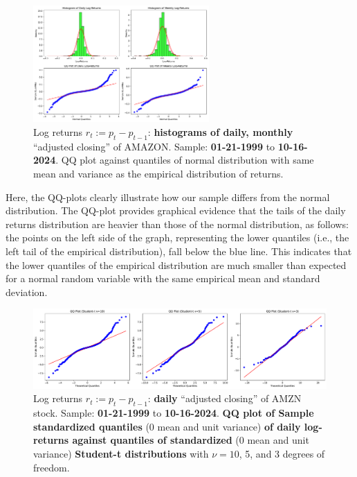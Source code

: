 \documentclass{article}
\begin{document}
\begin{figure}[H]
    \centering
    \includegraphics[width=0.6\textwidth]{Img/QQplot_daily_weekly_AMZN.pdf}
    \caption{Log returns $r_t := p_t - p_{t-1}$: \textbf{histograms of daily, monthly} “adjusted closing” of AMAZON. 
    Sample: \textbf{01-21-1999} to \textbf{10-16-2024}. QQ plot against quantiles of normal distribution with same mean and variance as the empirical distribution of returns.}
    \label{fig:Hstogram_QQ_plot}
\end{figure}

\noindent Here, the QQ-plots clearly illustrate how our sample differs from the normal distribution. 
The QQ-plot provides graphical evidence that the tails of the daily returns distribution are heavier than those of the normal distribution, as follows: 
the points on the left side of the graph, representing the lower quantiles (i.e., the left tail of the empirical distribution), 
fall below the blue line. This indicates that the lower quantiles of the empirical distribution are much smaller than expected for a normal random variable with the same empirical mean and standard deviation. 

\begin{figure}[H]
    \centering
    \includegraphics[width=1\textwidth]{Img/qqplt_tstudents_AMZNdaily.pdf}
    \caption{Log returns $r_t := p_t - p_{t-1}$: \textbf{daily} “adjusted closing” of AMZN stock. 
    Sample: \textbf{01-21-1999} to \textbf{10-16-2024}. \textbf{QQ plot of Sample standardized quantiles} (0 mean and unit variance) \textbf{of daily log-returns against quantiles of standardized} (0 mean and unit variance) \textbf{Student-t distributions} with $\nu = 10$, 5, and 3 degrees of freedom.}
    \label{fig:Hstogram_QQ_plot_T_student}
\end{figure}
\end{document}
